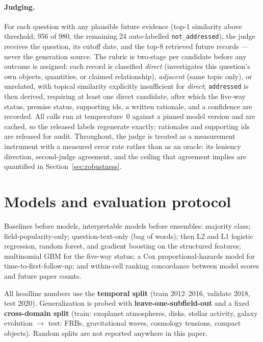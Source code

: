\documentclass[11pt]{article}
\begin{document}
\paragraph{Judging.} For each question with any plausible future
evidence (top-1 similarity above threshold; 956 of 980, the remaining 24
auto-labelled \texttt{not\_addressed}), the judge receives the
question, its cutoff date, and the top-8 retrieved future records ---
never the generation source. The rubric is two-stage per candidate
before any outcome is assigned: each record is classified
\emph{direct} (investigates this question's own objects, quantities, or
claimed relationship), \emph{adjacent} (same topic only), or unrelated,
with topical similarity explicitly insufficient for \emph{direct};
\texttt{addressed} is then derived, requiring at least one direct
candidate, after which the five-way status, premise status, supporting
ids, a written rationale, and a confidence are recorded. All calls run
at temperature~0 against a pinned model version and are cached, so the
released labels regenerate exactly; rationales and supporting ids are
released for audit. Throughout, the judge is treated as a measurement
instrument with a measured error rate rather than as an oracle: its
leniency direction, second-judge agreement, and the ceiling that
agreement implies are quantified in Section~\ref{sec:robustness}.

\section{Models and evaluation protocol}
\label{sec:models}

Baselines before models, interpretable models before ensembles: majority
class; field-popularity-only; question-text-only (bag of words); then L2
and L1 logistic regression, random forest, and gradient boosting on the
structured features; multinomial GBM for the five-way status; a Cox
proportional-hazards model for time-to-first-follow-up; and within-cell
ranking concordance between model scores and future paper counts.

All headline numbers use the \textbf{temporal split} (train 2012--2016,
validate 2018, test 2020). Generalization is probed with
\textbf{leave-one-subfield-out} and a fixed \textbf{cross-domain split}
(train: exoplanet atmospheres, disks, stellar activity, galaxy evolution
$\rightarrow$ test: FRBs, gravitational waves, cosmology tensions,
compact objects). Random splits are not reported anywhere in this paper.
\end{document}
